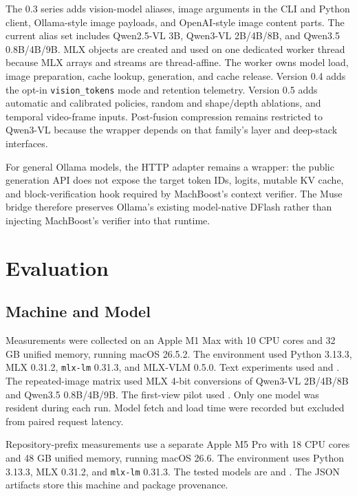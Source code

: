 \documentclass[11pt]{article}
\begin{document}
The 0.3 series adds vision-model aliases, image arguments in the CLI and Python client, Ollama-style image payloads, and OpenAI-style image content parts. The current alias set includes Qwen2.5-VL 3B, Qwen3-VL 2B/4B/8B, and Qwen3.5 0.8B/4B/9B. MLX objects are created and used on one dedicated worker thread because MLX arrays and streams are thread-affine. The worker owns model load, image preparation, cache lookup, generation, and cache release. Version 0.4 adds the opt-in \texttt{vision\_tokens} mode and retention telemetry. Version 0.5 adds automatic and calibrated policies, random and shape/depth ablations, and temporal video-frame inputs. Post-fusion compression remains restricted to Qwen3-VL because the wrapper depends on that family's layer and deep-stack interfaces.

For general Ollama models, the HTTP adapter remains a wrapper: the public
generation API does not expose the target token IDs, logits, mutable KV cache,
and block-verification hook required by MachBoost's context verifier. The Muse
bridge therefore preserves Ollama's existing model-native DFlash rather than
injecting MachBoost's verifier into that runtime.

\section{Evaluation}
\subsection{Machine and Model}
Measurements were collected on an Apple M1 Max with 10 CPU cores and 32 GB unified memory, running macOS 26.5.2. The environment used Python 3.13.3, MLX 0.31.2, \texttt{mlx-lm} 0.31.3, and MLX-VLM 0.5.0. Text experiments used  and . The repeated-image matrix used MLX 4-bit conversions of Qwen3-VL 2B/4B/8B and Qwen3.5 0.8B/4B/9B. The first-view pilot used . Only one model was resident during each run. Model fetch and load time were recorded but excluded from paired request latency.

Repository-prefix measurements use a separate Apple M5 Pro with 18 CPU cores
and 48 GB unified memory, running macOS 26.6. The environment uses Python
3.13.3, MLX 0.31.2, and \texttt{mlx-lm} 0.31.3. The tested models are
 and
. The JSON artifacts store this
machine and package provenance.
\end{document}
